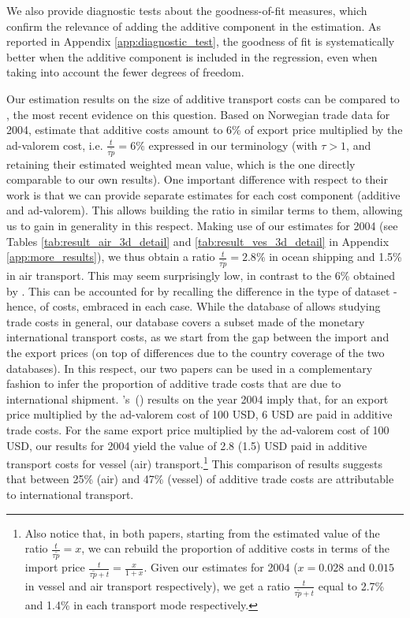 \documentclass[a4paper,11pt]{article}
\newcommand\cites[1]{\citeauthor{#1}'s\ (\citeyear{#1})}
\begin{document}
We also provide diagnostic tests about the goodness-of-fit measures, which confirm the relevance of adding the additive component in the estimation. As reported in Appendix \ref{app:diagnostic_test}, the goodness of fit is systematically better when the additive component is included in the regression, even when taking into account the fewer degrees of freedom.\smallskip


Our estimation results on the size of additive transport costs can be compared to \cite{Irrazabal_2015}, the most recent evidence on this question.
Based on Norwegian trade data for 2004, \cite{Irrazabal_2015} estimate that additive costs amount to 6\% of export price multiplied by the ad-valorem cost, i.e.
$\frac{t}{\tau\widetilde{p}}=6\%$ expressed in our terminology (with $\tau>1$, and retaining their estimated weighted mean value, which is the one directly comparable to our own results).
One important difference with respect to their work is that we can provide separate estimates for each cost component (additive and ad-valorem).
This allows building the ratio in similar terms to them, allowing us to gain in generality in this respect.
Making use of our estimates for 2004 (see Tables \ref{tab:result_air_3d_detail} and \ref{tab:result_ves_3d_detail} in Appendix \ref{app:more_results}), we thus obtain a ratio $\frac{t}{\tau\widetilde{p}}=2.8\%$ in ocean shipping and 1.5\% in air transport.
This may seem surprisingly low, in contrast to the 6\% obtained by \cite{Irrazabal_2015}.
This can be accounted for by recalling the difference in the type of dataset - hence, of costs, embraced in each case.
While the database of \cite{Irrazabal_2015} allows studying trade costs in general, our database covers a subset made of the monetary international transport costs, as we start from the gap between the import and the export prices (on top of differences due to the country coverage of the two databases).
In this respect, our two papers can be used in a complementary fashion to infer the proportion of additive trade costs that are due to international shipment.
\cites{Irrazabal_2015} results on the year 2004 imply that, for an export price multiplied by the ad-valorem cost of 100 USD, 6 USD are paid in additive trade costs.
For the same export price multiplied by the ad-valorem cost of 100 USD, our results for 2004 yield the value of 2.8 (1.5) USD paid in additive transport costs for vessel (air) transport.\footnote{Also notice that, in both papers, starting from the estimated value of the ratio $\frac{t}{\tau \widetilde{p}}= x$, we can rebuild the proportion of additive costs in terms of the import price $\frac{t}{\tau \widetilde{p} + t} = \frac{x}{1+x}$.
Given our estimates for 2004 ($x = 0.028$ and $0.015$ in vessel and air transport respectively), we get a ratio $\frac{t}{\tau \widetilde{p} + t}$ equal to 2.7\% and 1.4\% in each transport mode respectively.} This comparison of results suggests that between 25\% (air) and 47\% (vessel) of additive trade costs are attributable to international transport.
\end{document}
